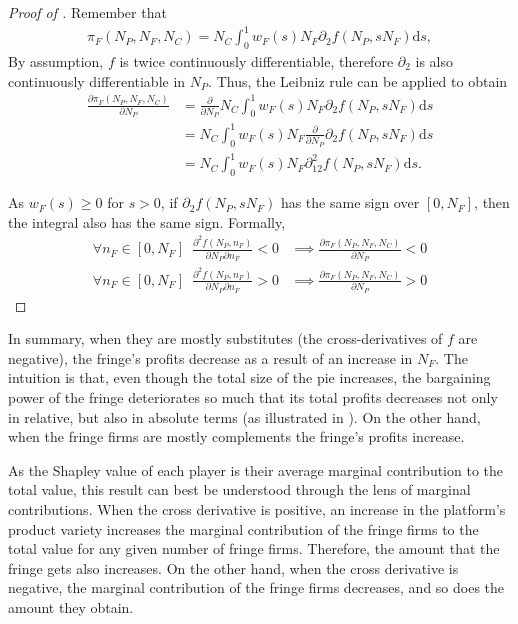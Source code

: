 \documentclass[a4paper]{article}
\newcommand{\ds}{\mathrm{d}s}
\begin{document}
\begin{proof}[Proof of ]
    Remember that
    \begin{align*}
        \pi_F(N_P, N_F, N_C) = N_C \int_0^1 w_F(s) N_F \partial_2 f(N_P, s N_F) \ds,
    \end{align*}
    By assumption, $f$ is twice continuously differentiable, therefore $\partial_2$ is also continuously differentiable in $N_P$.
    Thus, the Leibniz rule can be applied to obtain
    \begin{align*}
        \frac{\partial \pi_F(N_P, N_F, N_C)}{\partial N_P} &= \frac{\partial}{\partial N_P} N_C \int_0^1 w_F(s) N_F \partial_2 f(N_P, s N_F) \ds \\
        &= N_C \int_0^1 w_F(s) N_F \frac{\partial}{\partial N_P} \partial_2 f(N_P, s N_F) \ds \\
        &= N_C \int_0^1 w_F(s) N_F \partial^2_{12} f(N_P, s N_F) \ds.
    \end{align*}

    As $w_F(s) \geq 0$ for $s > 0$, if $\partial_2 f(N_P, s N_F)$ has the same sign over $[0, N_F]$, then the integral also has the same sign.
    Formally,
    \begin{align*}
        \forall n_F \in [0, N_F] \enspace \frac{\partial^2 f(N_P, n_F)}{\partial N_P \partial n_F} < 0 &\implies \frac{\partial \pi_F(N_P, N_F, N_C)}{\partial N_P} < 0 \\
        \forall n_F \in [0, N_F] \enspace \frac{\partial^2 f(N_P, n_F)}{\partial N_P \partial n_F} > 0 &\implies \frac{\partial \pi_F(N_P, N_F, N_C)}{\partial N_P} > 0
    \end{align*}
\end{proof}
In summary, when they are mostly substitutes (the cross-derivatives of $f$ are negative), the fringe's profits decrease as a result of an increase in $N_F$.
The intuition is that, even though the total size of the pie increases, the bargaining power of the fringe deteriorates so much that its total profits decreases not only in relative, but also in absolute terms (as illustrated in ).
On the other hand, when the fringe firms are mostly complements the fringe's profits increase.

As the Shapley value of each player is their average marginal contribution to the total value, this result can best be understood through the lens of marginal contributions.
When the cross derivative is positive, an increase in the platform's product variety increases the marginal contribution of the fringe firms to the total value for any given number of fringe firms.
Therefore, the amount that the fringe gets also increases.
On the other hand, when the cross derivative is negative, the marginal contribution of the fringe firms decreases, and so does the amount they obtain.
\end{document}
